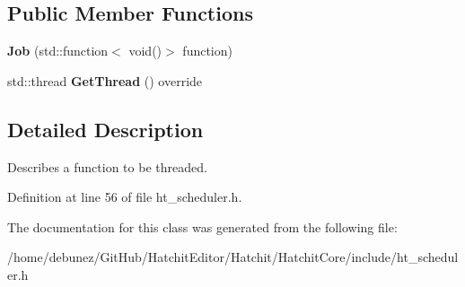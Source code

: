 \subsection*{Public Member Functions}
\begin{DoxyCompactItemize}
\item 
{\bfseries Job} (std\+::function$<$ void()$>$ function)\hypertarget{classHatchit_1_1Core_1_1Job_a7b39934793bb408dfa2e7dc536326ae1}{}\label{classHatchit_1_1Core_1_1Job_a7b39934793bb408dfa2e7dc536326ae1}

\item 
std\+::thread {\bfseries Get\+Thread} () override\hypertarget{classHatchit_1_1Core_1_1Job_ab4edf2e76e836f3a3690dc01f69f7a88}{}\label{classHatchit_1_1Core_1_1Job_ab4edf2e76e836f3a3690dc01f69f7a88}

\end{DoxyCompactItemize}


\subsection{Detailed Description}
Describes a function to be threaded. 

Definition at line 56 of file ht\+\_\+scheduler.\+h.



The documentation for this class was generated from the following file\+:\begin{DoxyCompactItemize}
\item 
/home/debunez/\+Git\+Hub/\+Hatchit\+Editor/\+Hatchit/\+Hatchit\+Core/include/ht\+\_\+scheduler.\+h\end{DoxyCompactItemize}
